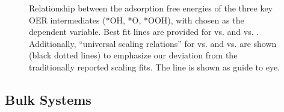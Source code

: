 \begin{figure}[!htb]
\centering
{}
\caption{\label{fig:scaling_relations}
%
Relationship between the adsorption free energies of the three key OER intermediates (*OH, *O, *OOH), with \DGOH chosen as the dependent variable.
%
Best fit lines are provided for \DGOOH vs. \DGOH and \DGO vs. \DGOH.
%
Additionally, ``universal scaling relations'' for \DGOOH vs. \DGOH and \DGO vs. \DGOH are shown (black dotted lines) to emphasize our deviation from the traditionally reported scaling fits.
%
The \DGOH line is  shown as guide to eye.
}
\end{figure}


\subsection{Bulk Systems}  %
%


%


